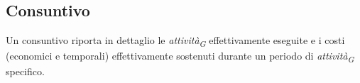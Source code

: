 \subsection{Consuntivo}
Un consuntivo riporta in dettaglio le \textit{attività}\textsubscript{\textit{G}} effettivamente eseguite e i costi (economici e temporali) effettivamente sostenuti durante un periodo di \textit{attività}\textsubscript{\textit{G}} specifico.  
